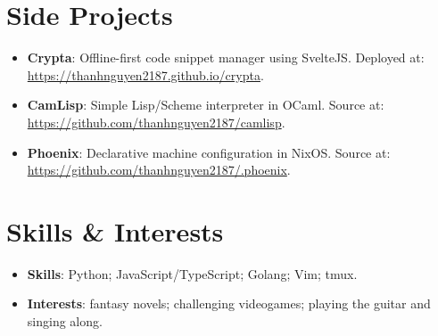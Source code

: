 \documentclass[letterpaper,11pt]{article}
\newcommand{\resumeItem}[2]{
  \item\small{
    \textbf{#1}{: #2 \vspace{-2pt}}
  }
}
\newcommand{\resumeSubItem}[2]{\resumeItem{#1}{#2}\vspace{-4pt}}
\newcommand{\resumeSubHeadingListStart}{\begin{itemize}[leftmargin=*]}
\newcommand{\resumeSubHeadingListEnd}{\end{itemize}}
\begin{document}
\section{Side Projects}
  \resumeSubHeadingListStart
    \resumeSubItem{Crypta}
      {Offline-first code snippet manager using SvelteJS. Deployed at: 
      \href{https://thanhnguyen2187.github.io/crypta}{https://thanhnguyen2187.github.io/crypta}.}
    \resumeSubItem{CamLisp}
      {Simple Lisp/Scheme interpreter in OCaml. Source at:
      \href{https://github.com/thanhnguyen2187/camlisp}{https://github.com/thanhnguyen2187/camlisp}.}
    \resumeSubItem{Phoenix}
      {Declarative machine configuration in NixOS. Source at:
      \href{https://github.com/thanhnguyen2187/.phoenix}{https://github.com/thanhnguyen2187/.phoenix}.}
  \resumeSubHeadingListEnd

\section{Skills \& Interests}
  \resumeSubHeadingListStart
    \resumeSubItem{Skills}{Python; JavaScript/TypeScript; Golang; Vim; tmux.}
    \resumeSubItem{Interests}{fantasy novels; challenging videogames; playing
    the guitar and singing along.}
  \resumeSubHeadingListEnd

\end{document}
